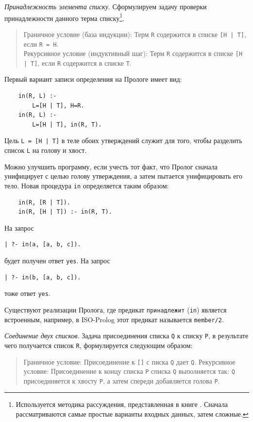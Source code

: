 \documentclass[12pt, openany, twoside]{book} %
\begin{document}
\emph{Принадлежность элемента списку}. Сформулируем задачу проверки принадлежности данного терма списку\footnote{Используется методика рассуждения, представленная в книге \cite{Bratko}. Сначала рассматриваются самые простые варианты входных данных, затем сложные.}.

\begin{quote}
\noindent Граничное условие (база индукции): Терм {\tt R} содержится в списке {\tt [H | T]}, если {\tt R = H}.\\
Рекурсивное условие (индуктивный шаг): Терм {\tt R} содержится в списке {\tt [H | T]}, если {\tt R}
содержится в списке {\tt Т}.
\end{quote}

\noindent Первый вариант записи определения на Прологе имеет вид:
{\tt\begin{verbatim}
    in(R, L) :-
        L=[H | T], H=R.
    in(R, L) :-
        L=[H | T], in(R, T).
\end{verbatim}}

\noindent Цель {\tt L = [H | T]} в теле обоих утверждений служит для того, чтобы разделить список {\tt L} на голову и хвост.

Можно улучшить программу, если учесть тот факт, что Пролог сначала унифицирует с целью голову утверждения, а затем пытается унифицировать его тело. Новая процедура {\tt in} определяется таким образом:
{\tt\begin{verbatim}
    in(R, [R | Т]).
    in(R, [H | Т]) :- in(R, T).
\end{verbatim}}

\noindent На запрос
{\tt\begin{verbatim}
| ?- in(а, [а, b, с]).
\end{verbatim}}
\noindent будет получен ответ {\tt yes}.
\noindent На запрос
{\tt\begin{verbatim}
| ?- in(b, [a, b, с]).
\end{verbatim}}
\noindent тоже ответ {\tt yes}.

Существуют реализации Пролога, где предикат {\tt принадлежит} ({\tt in}) является встроенным, например, в ISO-Prolog этот предикат называется \texttt{member/2}.

\emph{Соединение двух списков}. Задача присоединения списка {\tt Q} к списку {\tt Р}, в результате чего получается список {\tt R}, формулируется следующим образом:
\begin{quote}
\noindent Граничное условие: Присоединение к {\tt []} с писка {\tt Q} дает {\tt Q}.
\noindent Рекурсивное условие: Присоединение к концу списка {\tt Р} списка {\tt Q} выполняется так: {\tt Q} присоединяется к хвосту {\tt Р}, а затем спереди добавляется голова {\tt Р}.
\end{quote}
\end{document}
